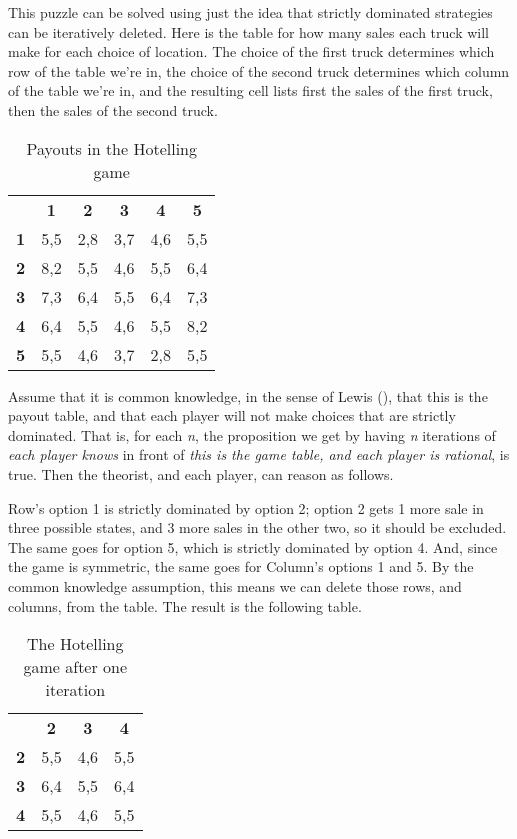 \documentclass[
  12pt,
  letterpaper,
]{scrbook}
\begin{document}
This puzzle can be solved using just the idea that strictly dominated
strategies can be iteratively deleted. Here is the table for how many
sales each truck will make for each choice of location. The choice of
the first truck determines which row of the table we're in, the choice
of the second truck determines which column of the table we're in, and
the resulting cell lists first the sales of the first truck, then the
sales of the second truck.

\begin{longtable}[]{@{}rccccc@{}}
\caption{Payouts in the Hotelling
game}\label{tbl-hotelling}\tabularnewline
\toprule\noalign{}
\endfirsthead
\endhead
\bottomrule\noalign{}
\endlastfoot
& \textbf{1} & \textbf{2} & \textbf{3} & \textbf{4} & \textbf{5} \\
\textbf{1} & 5,5 & 2,8 & 3,7 & 4,6 & 5,5 \\
\textbf{2} & 8,2 & 5,5 & 4,6 & 5,5 & 6,4 \\
\textbf{3} & 7,3 & 6,4 & 5,5 & 6,4 & 7,3 \\
\textbf{4} & 6,4 & 5,5 & 4,6 & 5,5 & 8,2 \\
\textbf{5} & 5,5 & 4,6 & 3,7 & 2,8 & 5,5 \\
\end{longtable}

Assume that it is common knowledge, in the sense of Lewis
(), that this is the payout table, and
that each player will not make choices that are strictly dominated. That
is, for each \emph{n}, the proposition we get by having \emph{n}
iterations of \emph{each player knows} in front of \emph{this is the
game table, and each player is rational}, is true. Then the theorist,
and each player, can reason as follows.

Row's option 1 is strictly dominated by option 2; option 2 gets 1 more
sale in three possible states, and 3 more sales in the other two, so it
should be excluded. The same goes for option 5, which is strictly
dominated by option 4. And, since the game is symmetric, the same goes
for Column's options 1 and 5. By the common knowledge assumption, this
means we can delete those rows, and columns, from the table. The result
is the following table.

\begin{longtable}[]{@{}lccc@{}}
\caption{The Hotelling game after one
iteration}\label{tbl-hotelling-iterated}\tabularnewline
\toprule\noalign{}
\endfirsthead
\endhead
\bottomrule\noalign{}
\endlastfoot
& \textbf{2} & \textbf{3} & \textbf{4} \\
\textbf{2} & 5,5 & 4,6 & 5,5 \\
\textbf{3} & 6,4 & 5,5 & 6,4 \\
\textbf{4} & 5,5 & 4,6 & 5,5 \\
\end{longtable}
\end{document}
